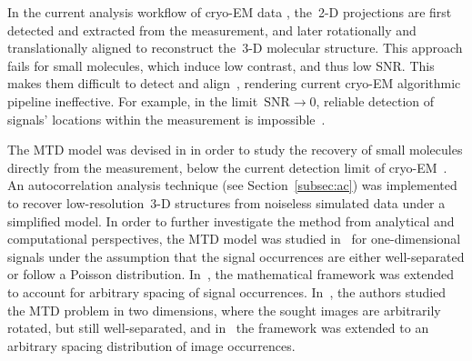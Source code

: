 \documentclass{article}
\begin{document}
In the current analysis workflow of \mbox{cryo-EM} data \cite{bendory2020single,singer2020computational,scheres2012relion,punjani2017cryosparc}, the~\mbox{2-D} projections are first detected and extracted from the measurement, and later rotationally and translationally aligned to reconstruct the~\mbox{3-D} molecular structure. This approach fails for small molecules, which induce low contrast, and thus low SNR. This makes them difficult to detect and align~\cite{bendory2018toward,singer2020computational,henderson1995potential,aguerrebere2016fundamental}, rendering current \mbox{cryo-EM} algorithmic pipeline ineffective. For example, in the limit~\mbox{$\text{SNR} \rightarrow 0$}, reliable detection of signals' locations within the measurement is impossible~\cite[Proposition~3.1]{bendory2018toward}.

The MTD model was devised in \cite{bendory2018toward} in order to study the recovery of small molecules directly from the measurement, below the current detection limit of \mbox{cryo-EM}~\cite{henderson1995potential,d2021current}. An autocorrelation analysis technique (see Section~\ref{subsec:ac}) was implemented to recover \mbox{low-resolution}~\mbox{3-D} structures from noiseless simulated data under a simplified model. In order to further investigate the method from analytical and computational perspectives, the MTD model was studied in~\cite{bendory2019multi} for one-dimensional signals  under the assumption that the signal occurrences are either {well-separated} or follow a Poisson distribution. In~\cite{lan2020multi}, the mathematical framework was extended to account for arbitrary spacing of signal occurrences. In~\cite{marshall2020image,bendory2021multi}, the authors studied the MTD problem in two dimensions, where the sought images are arbitrarily rotated, but still \mbox{well-separated}, and in~\cite{kreymer2021two} the framework was extended  to an arbitrary spacing distribution of image occurrences.
\end{document}
